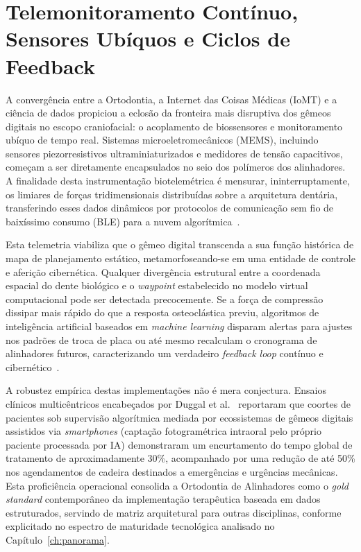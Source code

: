 \section{Telemonitoramento Contínuo, Sensores Ubíquos e Ciclos de Feedback}

A convergência entre a Ortodontia, a Internet das Coisas Médicas (IoMT) e a ciência de dados propiciou a eclosão da fronteira mais disruptiva dos gêmeos digitais no escopo craniofacial: o acoplamento de biossensores e monitoramento ubíquo de tempo real. Sistemas microeletromecânicos (MEMS), incluindo sensores piezorresistivos ultraminiaturizados e medidores de tensão capacitivos, começam a ser diretamente encapsulados no seio dos polímeros dos alinhadores. A finalidade desta instrumentação biotelemétrica é mensurar, ininterruptamente, os limiares de forças tridimensionais distribuídas sobre a arquitetura dentária, transferindo esses dados dinâmicos por protocolos de comunicação sem fio de baixíssimo consumo (BLE) para a nuvem algorítmica~\cite{khoshfekr2025digital}.

Esta telemetria viabiliza que o gêmeo digital transcenda a sua função histórica de mapa de planejamento estático, metamorfoseando-se em uma entidade de controle e aferição cibernética. Qualquer divergência estrutural entre a coordenada espacial do dente biológico e o \textit{waypoint} estabelecido no modelo virtual computacional pode ser detectada precocemente. Se a força de compressão dissipar mais rápido do que a resposta osteoclástica previu, algoritmos de inteligência artificial baseados em \textit{machine learning} disparam alertas para ajustes nos padrões de troca de placa ou até mesmo recalculam o cronograma de alinhadores futuros, caracterizando um verdadeiro \textit{feedback loop} contínuo e cibernético~\cite{olawade2026advancing}.

A robustez empírica destas implementações não é mera conjectura. Ensaios clínicos multicêntricos encabeçados por Duggal et al.~\cite{duggal2026exploring} reportaram que coortes de pacientes sob supervisão algorítmica mediada por ecossistemas de gêmeos digitais assistidos via \textit{smartphones} (captação fotogramétrica intraoral pelo próprio paciente processada por IA) demonstraram um encurtamento do tempo global de tratamento de aproximadamente 30\%, acompanhado por uma redução de até 50\% nos agendamentos de cadeira destinados a emergências e urgências mecânicas. Esta proficiência operacional consolida a Ortodontia de Alinhadores como o \textit{gold standard} contemporâneo da implementação terapêutica baseada em dados estruturados, servindo de matriz arquitetural para outras disciplinas, conforme explicitado no espectro de maturidade tecnológica analisado no Capítulo~\ref{ch:panorama}.
